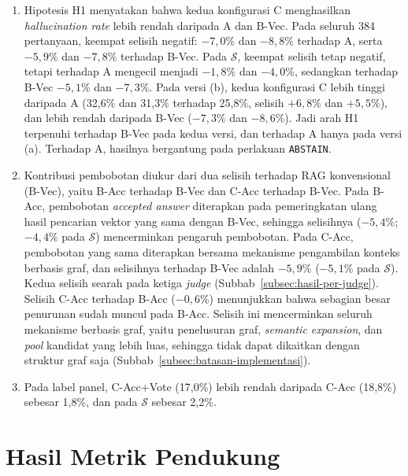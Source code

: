 \begin{enumerate}
    \item[\textbf{H1 (RQ3).}] Hipotesis H1 menyatakan bahwa kedua konfigurasi C menghasilkan \emph{hallucination rate} lebih rendah daripada A dan B-Vec. Pada seluruh 384 pertanyaan, keempat selisih negatif: $-7{,}0\%$ dan $-8{,}8\%$ terhadap A, serta $-5{,}9\%$ dan $-7{,}8\%$ terhadap B-Vec. Pada $\mathcal{S}$, keempat selisih tetap negatif, tetapi terhadap A mengecil menjadi $-1{,}8\%$ dan $-4{,}0\%$, sedangkan terhadap B-Vec $-5{,}1\%$ dan $-7{,}3\%$. Pada versi (b), kedua konfigurasi C lebih tinggi daripada A (32,6\% dan 31,3\% terhadap 25,8\%, selisih $+6{,}8\%$ dan $+5{,}5\%$), dan lebih rendah daripada B-Vec ($-7{,}3\%$ dan $-8{,}6\%$). Jadi arah H1 terpenuhi terhadap B-Vec pada kedua versi, dan terhadap A hanya pada versi (a). Terhadap A, hasilnya bergantung pada perlakuan \texttt{ABSTAIN}.

    \item[\textbf{RQ4.}] Kontribusi pembobotan diukur dari dua selisih terhadap RAG konvensional (B-Vec), yaitu B-Acc terhadap B-Vec dan C-Acc terhadap B-Vec. Pada B-Acc, pembobotan \emph{accepted answer} diterapkan pada pemeringkatan ulang hasil pencarian vektor yang sama dengan B-Vec, sehingga selisihnya ($-5{,}4\%$; $-4{,}4\%$ pada $\mathcal{S}$) mencerminkan pengaruh pembobotan. Pada C-Acc, pembobotan yang sama diterapkan bersama mekanisme pengambilan konteks berbasis graf, dan selisihnya terhadap B-Vec adalah $-5{,}9\%$ ($-5{,}1\%$ pada $\mathcal{S}$). Kedua selisih searah pada ketiga \emph{judge} (Subbab~\ref{subsec:hasil-per-judge}). Selisih C-Acc terhadap B-Acc ($-0{,}6\%$) menunjukkan bahwa sebagian besar penurunan sudah muncul pada B-Acc. Selisih ini mencerminkan seluruh mekanisme berbasis graf, yaitu penelusuran graf, \emph{semantic expansion}, dan \emph{pool} kandidat yang lebih luas, sehingga tidak dapat dikaitkan dengan struktur graf saja (Subbab~\ref{subsec:batasan-implementasi}).

    \item[\textbf{RQ5 (eksploratif).}] Pada label panel, C-Acc+Vote (17,0\%) lebih rendah daripada C-Acc (18,8\%) sebesar 1,8\%, dan pada $\mathcal{S}$ sebesar 2,2\%.
\end{enumerate}

\section{Hasil Metrik Pendukung}
\label{sec:hasil-pendukung}

